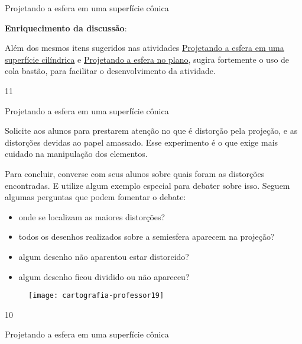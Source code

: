 {\begin{sugestions}{Projetando a esfera em uma superfície cônica}
{  \textbf{Enriquecimento da discussão}:
  
 Além dos mesmos itens sugeridos nas atividades \hyperref[proj_cil]{Projetando a esfera em uma superfície cilíndrica}   e \hyperref[proj-planas]{Projetando a esfera no plano}, sugira fortemente o uso de cola bastão, para facilitar o desenvolvimento da atividade.
}{1}{1}
\end{sugestions}
\clearmargin
\begin{sugestions}{Projetando a esfera em uma superfície cônica}
{


  Solicite aos alunos para prestarem atenção no que é distorção pela projeção, e as distorções devidas ao papel amassado. Esse experimento é o que exige mais cuidado na manipulação dos elementos.

  Para concluir, converse com seus alunos sobre quais foram as distorções encontradas. E  utilize algum exemplo especial para debater sobre isso. Seguem algumas perguntas que podem fomentar o debate:

  \begin{itemize}
  \item onde se localizam as maiores distorções?
  \item todos os desenhos realizados sobre a semiesfera aparecem na projeção?
  \item algum desenho não aparentou estar distorcido?
  \item algum desenho ficou dividido ou não apareceu?
  \end{itemize}

  \begin{figure}[H]
  \centering
  
  \texttt{[image: cartografia-professor19]}
  \end{figure}



}{1}{0}
\end{sugestions}


\label{Pconica}

\begin{task}{Projetando a esfera em uma superfície cônica} \label{proj-conicas}


\end{task}}
